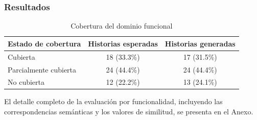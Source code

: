 \subsubsection{Resultados}

\begin{table}[H]
\centering
\begin{tabular}{|l|c|c|}
\hline
\textbf{Estado de cobertura} & \textbf{Historias esperadas} & \textbf{Historias generadas} \\ 
\hline
Cubierta & 18 (33.3\%) & 17 (31.5\%) \\ 
Parcialmente cubierta & 24 (44.4\%) & 24 (44.4\%) \\ 
No cubierta & 12 (22.2\%) & 13 (24.1\%) \\ 
\hline
\end{tabular}
\caption{Cobertura del dominio funcional}
\label{tab:cobertura_funcional}
\end{table}

El detalle completo de la evaluación por funcionalidad, incluyendo las correspondencias semánticas y los valores de similitud, se presenta en el Anexo.

